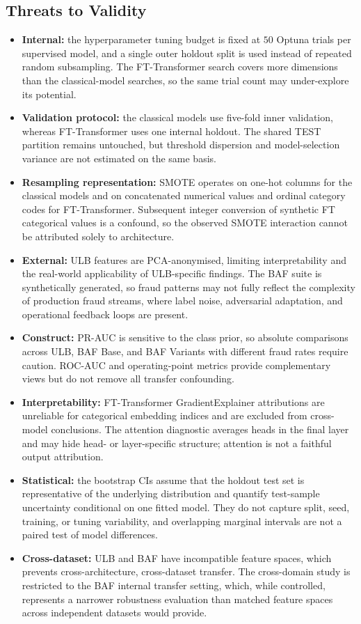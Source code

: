 \subsection*{Threats to Validity}
\begin{itemize}
  \item \textbf{Internal:} the hyperparameter tuning budget is fixed at $50$ Optuna trials per supervised model, and a single outer holdout split is used instead of repeated random subsampling. The FT-Transformer search covers more dimensions than the classical-model searches, so the same trial count may under-explore its potential.
  \item \textbf{Validation protocol:} the classical models use five-fold inner validation, whereas FT-Transformer uses one internal holdout. The shared TEST partition remains untouched, but threshold dispersion and model-selection variance are not estimated on the same basis.
  \item \textbf{Resampling representation:} SMOTE operates on one-hot columns for the classical models and on concatenated numerical values and ordinal category codes for FT-Transformer. Subsequent integer conversion of synthetic FT categorical values is a confound, so the observed SMOTE interaction cannot be attributed solely to architecture.
  \item \textbf{External:} ULB features are PCA-anonymised, limiting interpretability and the real-world applicability of ULB-specific findings. The BAF suite is synthetically generated, so fraud patterns may not fully reflect the complexity of production fraud streams, where label noise, adversarial adaptation, and operational feedback loops are present.
  \item \textbf{Construct:} PR-AUC is sensitive to the class prior, so absolute comparisons across ULB, BAF Base, and BAF Variants with different fraud rates require caution. ROC-AUC and operating-point metrics provide complementary views but do not remove all transfer confounding.
  \item \textbf{Interpretability:} FT-Transformer GradientExplainer attributions are unreliable for categorical embedding indices and are excluded from cross-model conclusions. The attention diagnostic averages heads in the final layer and may hide head- or layer-specific structure; attention is not a faithful output attribution.
  \item \textbf{Statistical:} the bootstrap CIs assume that the holdout test set is representative of the underlying distribution and quantify test-sample uncertainty conditional on one fitted model. They do not capture split, seed, training, or tuning variability, and overlapping marginal intervals are not a paired test of model differences.
  \item \textbf{Cross-dataset:} ULB and BAF have incompatible feature spaces, which prevents cross-architecture, cross-dataset transfer. The cross-domain study is restricted to the BAF internal transfer setting, which, while controlled, represents a narrower robustness evaluation than matched feature spaces across independent datasets would provide.
\end{itemize}

\clearpage
\flushbottom
